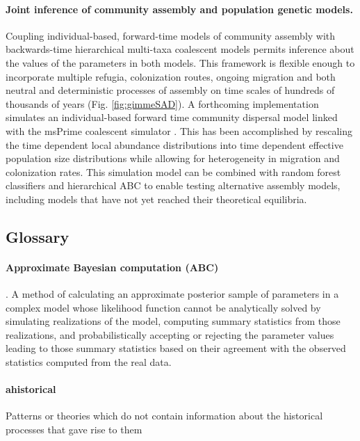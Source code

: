 \documentclass[12pt]{article}
\begin{document}
\paragraph{Joint inference of community assembly and population
  genetic models.} Coupling individual-based, forward-time models of
community assembly with backwards-time hierarchical multi-taxa
coalescent models permits inference about the values of the parameters
in both models. This framework is flexible enough to incorporate
multiple refugia, colonization routes, ongoing migration and both
neutral and deterministic processes of assembly on time scales of
hundreds of thousands of years (Fig. \ref{fig:gimmeSAD}). A
forthcoming implementation \citep[gimmeSAD$\pi$;][]{overcast}
simulates an individual-based forward time community dispersal model
\citep{Rosindell2015-dk} linked with the msPrime coalescent simulator
\citep{kelleher2016}. This has been accomplished by rescaling the time
dependent local abundance distributions into time dependent effective
population size distributions while allowing for heterogeneity in
migration and colonization rates. This simulation model can be
combined with random forest classifiers and hierarchical ABC to enable
testing alternative assembly models, including models that have not
yet reached their theoretical equilibria.


\subsection*{Glossary}

\paragraph{Approximate Bayesian computation (ABC)}. A method of
calculating an approximate posterior sample of parameters in a complex model
whose likelihood function cannot be analytically solved by simulating
realizations of the model, computing summary statistics from those
realizations, and probabilistically accepting or rejecting the
parameter values leading to those summary statistics based on their
agreement with the observed statistics computed from the real data.

\paragraph{ahistorical} Patterns or theories which do not contain
information about the historical processes that gave rise to them
\end{document}

